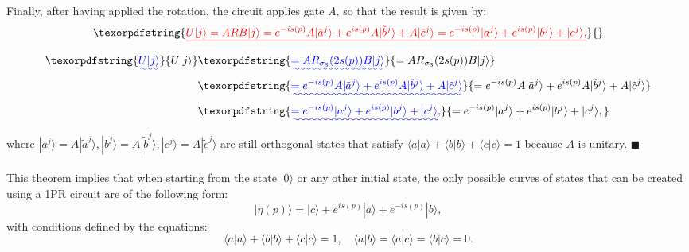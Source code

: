 \documentclass[10pt,letterpaper]{article} %
\providecommand{\DIFaddtex}[1]{{\protect\color{blue}\uwave{#1}}} %
\providecommand{\DIFdeltex}[1]{{\protect\color{red}\sout{#1}}}                      %
\providecommand{\DIFaddbegin}{} %
\providecommand{\DIFaddend}{} %
\providecommand{\DIFdelbegin}{} %
\providecommand{\DIFdelend}{} %
\providecommand{\DIFadd}[1]{\texorpdfstring{\DIFaddtex{#1}}{#1}} %
\providecommand{\DIFdel}[1]{\texorpdfstring{\DIFdeltex{#1}}{}} %
\newcommand{\DIFscaledelfig}{0.5}
\newlength{\DIFdelgraphicswidth} %
\newlength{\DIFdelgraphicsheight} %
\newcommand{\DIFaddincludegraphics}[2][]{{\color{blue}\fbox{\DIFOincludegraphics[#1]{#2}}}} %
\newcommand{\DIFdelincludegraphics}[2][]{%
\sbox{\DIFdelgraphicsbox}{\DIFOincludegraphics[#1]{#2}}%
\settoboxwidth{\DIFdelgraphicswidth}{\DIFdelgraphicsbox} %
\settoboxtotalheight{\DIFdelgraphicsheight}{\DIFdelgraphicsbox} %
\scalebox{\DIFscaledelfig}{%
\parbox[b]{\DIFdelgraphicswidth}{\usebox{\DIFdelgraphicsbox}\\[-\baselineskip] \rule{\DIFdelgraphicswidth}{0em}}\llap{\resizebox{\DIFdelgraphicswidth}{\DIFdelgraphicsheight}{%
\setlength{\unitlength}{\DIFdelgraphicswidth}%
\begin{picture}(1,1)%
\thicklines\linethickness{2pt} %
{\color[rgb]{1,0,0}\put(0,0){\framebox(1,1){}}}%
{\color[rgb]{1,0,0}\put(0,0){\line( 1,1){1}}}%
{\color[rgb]{1,0,0}\put(0,1){\line(1,-1){1}}}%
\end{picture}%
}\hspace*{3pt}}} %
} %
\DeclareRobustCommand{\DIFaddbegin}{\DIFOaddbegin \let\includegraphics\DIFaddincludegraphics} %
\DeclareRobustCommand{\DIFaddend}{\DIFOaddend \let\includegraphics\DIFOincludegraphics} %
\DeclareRobustCommand{\DIFdelbegin}{\DIFOdelbegin \let\includegraphics\DIFdelincludegraphics} %
\DeclareRobustCommand{\DIFdelend}{\DIFOaddend \let\includegraphics\DIFOincludegraphics} %
\begin{document}
Finally, after having applied the rotation, the circuit applies gate $A$, 
so that the result is given by:
\DIFdelbegin \begin{eqnarray*}
\DIFdel{U|j\rangle = ARB|j\rangle = e^{-is(p)} A |\tilde{a}^j\rangle + e^{is(p)} A |\tilde{b}^j\rangle + A |\tilde{c}^j\rangle = e^{-is(p)} |a^j\rangle + e^{is(p)} |b^j\rangle + |c^j\rangle,
}\end{eqnarray*}%
\DIFdelend %
\DIFaddbegin \begin{align}
\DIFadd{U|j\rangle }&\DIFadd{= AR_{\sigma_3}(2s(p)) B|j\rangle \nonumber }\\
           &\DIFadd{= e^{-is(p)} A |\tilde{a}^j\rangle + e^{is(p)} A |\tilde{b}^j\rangle 
              + A |\tilde{c}^j\rangle \nonumber }\\
           &\DIFadd{= e^{-is(p)} |a^j\rangle + e^{is(p)} |b^j\rangle + |c^j\rangle,
}\end{align}\DIFaddend 
where $|a^j\rangle = A |\tilde{a}^j\rangle, |b^j\rangle = A |\tilde{b}^j\rangle, |c^j\rangle = A |\tilde{c}^j\rangle$ are still orthogonal
states that satisfy $\langle a| a\rangle + \langle b| b\rangle + \langle c| c\rangle = 1$ because $A$ is unitary. $\blacksquare$  \\
 $\;$ \\

This theorem implies that when starting from the state $|0\rangle$ 
or any other initial state, the only possible curves of states that can be 
created using a 1PR circuit are of the following form:
\begin{equation}
|\eta(p)\rangle = |c\rangle + e^{is(p)}|a\rangle + e^{-is(p)} |b\rangle,
\label{eq:curve-states}
\end{equation}
with conditions defined by the equations: 
\begin{equation}
\langle a| a\rangle + \langle b| b\rangle + \langle c| c\rangle = 1,  \quad
\langle a |b\rangle =
\langle a |c\rangle =
\langle b |c\rangle = 0.
\label{eq:conditions-vecs}
\end{equation}
\end{document}
